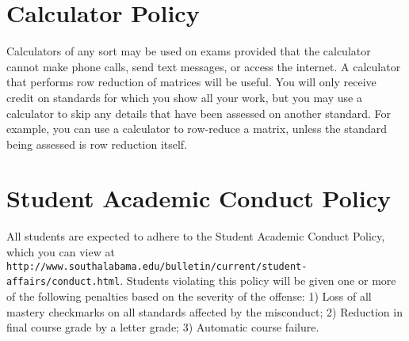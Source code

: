 


\section*{\fontsize{12}{15}\selectfont Calculator Policy}

Calculators of any sort may be used on exams provided that the calculator cannot make phone calls, send text messages, or access the internet. A calculator that performs row reduction of matrices will be useful.  You will only receive credit on standards for which you show all your work, but you may use a calculator to skip any details that have been assessed on another standard. For example, you can use a calculator to row-reduce a matrix, unless the standard being assessed is row reduction itself.

\section*{\fontsize{12}{15}\selectfont Student Academic Conduct Policy}
All students are expected to adhere to the Student Academic Conduct Policy, which you can view at
{\tt http://www.southalabama.edu/bulletin/current/student-affairs/conduct.html}.  Students violating this policy will be given one or more of the following penalties based on the severity of the offense:  1) Loss of all mastery checkmarks on all standards affected by the misconduct; 2) Reduction in final course grade by a letter grade; 3) Automatic course failure.




